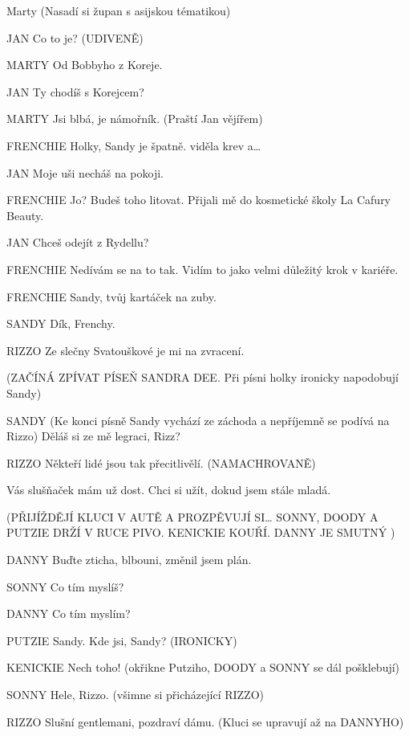  Marty  (Nasadí si župan s asijskou tématikou)

JAN        Co to je? (UDIVENĚ)

MARTY        Od Bobbyho z Koreje.

JAN        Ty chodíš s Korejcem? 

MARTY        Jsi blbá, je námořník. (Praští Jan vějířem) 

FRENCHIE        Holky, Sandy je špatně. viděla krev a…

JAN        Moje uši necháš na pokoji.

FRENCHIE        Jo? Budeš toho litovat. Přijali mě do kosmetické školy La Cafury Beauty.

JAN        Chceš odejít z Rydellu?

FRENCHIE        Nedívám se na to tak. Vidím to jako velmi důležitý krok v kariéře.

FRENCHIE        Sandy, tvůj kartáček na zuby.

SANDY        Dík, Frenchy. 

RIZZO        Ze slečny Svatouškové je mi na zvracení.

        (ZAČÍNÁ ZPÍVAT PÍSEŇ SANDRA DEE. Při písni holky ironicky                 napodobují Sandy)

SANDY        (Ke konci písně Sandy vychází ze záchoda a nepříjemně se podívá na         Rizzo)  Děláš si ze mě legraci, Rizz?

RIZZO        Někteří lidé jsou tak přecitlivělí. (NAMACHROVANĚ) 

        Vás slušňaček mám už dost. Chci si užít, dokud jsem stále mladá.





(PŘIJÍŽDĚJÍ KLUCI V AUTĚ A PROZPĚVUJÍ SI… SONNY, DOODY A PUTZIE         DRŽÍ V RUCE PIVO. KENICKIE KOUŘÍ. DANNY JE SMUTNÝ )

DANNY        Buďte zticha, blbouni, změnil jsem plán.

SONNY        Co tím myslíš?

DANNY        Co tím myslím? 

PUTZIE        Sandy. Kde jsi, Sandy? (IRONICKY)

KENICKIE        Nech toho! (okřikne Putziho, DOODY a SONNY se dál pošklebují)

SONNY        Hele, Rizzo. (všimne si přicházející RIZZO)

RIZZO        Slušní gentlemani,  pozdraví dámu. (Kluci se upravují až na DANNYHO)

